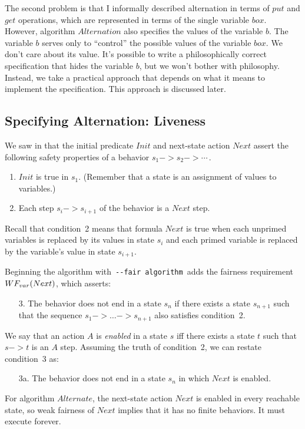 \documentclass[fleqn,leqno]{article}
\begin{document}
The second problem is that I informally described alternation in terms
of $put$ and $get$ operations, which are represented in terms of the
single variable $box$.  However, algorithm $Alternation$ also
specifies the values of the variable $b$.  The variable $b$ serves
only to ``control'' the possible values of the variable $box$.  We
don't care about its value.  It's possible to write a philosophically
correct specification that hides
the variable $b$, but we won't bother with philosophy.  Instead, we
take a practical approach that depends on what it means to implement
the specification.  This approach is discussed later.


\subsection{Specifying Alternation: Liveness} 

We saw in 
that the initial predicate $Init$ and next-state action $Next$ assert
the following safety properties of a behavior $s_{1}-> s_{2} ->
\cdots$\,.
\begin{enumerate}
\item $Init$ is true in $s_{1}$.
(Remember that a state is an assignment of values to variables.)

\item Each step $s_{i}->s_{i+1}$ of the behavior is a $Next$ step.
\end{enumerate}
Recall that condition~2 means that formula $Next$ is true when each
unprimed variables is replaced by its values in state $s_{i}$ and each
primed variable is replaced by the variable's value in state
$s_{i+1}$.

Beginning the algorithm with \,\texttt{-\mbox{}-fair algorithm}\,
adds the fairness requirement $\WF_{var}(Next)$, which asserts:
\begin{enumerate}
\item[3.] The behavior does not end in a state $s_{n}$ if there exists
a state $s_{n+1}$ such that the sequence $s_{1}->\ldots->s_{n+1}$ also
satisfies condition~2.
\end{enumerate}
We say that an action $A$ is 
\emph{enabled} in a state $s$ iff there exists a state $t$ such that
$s->t$ is an $A$ step.  Assuming the truth of condition~2, we can
restate condition~3 as:
\begin{enumerate}
\item[3a.] The behavior does not end in a state $s_{n}$ in which
$Next$ is enabled.
\end{enumerate}
For algorithm $Alternate$, the next-state action $Next$ is enabled in
every reachable state, so weak fairness of $Next$ implies that 
it has no finite behaviors.  It must execute forever.
\end{document}
